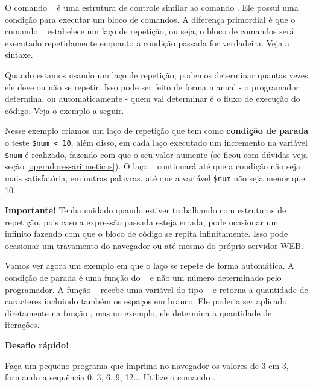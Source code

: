 O comando \comandowhile~ é uma estrutura de controle similar ao comando \comandoif. Ele possui 
uma condição para executar um bloco de comandos. A diferença primordial é que o comando 
\comandowhile~ estabelece um laço de repetição, ou seja, o bloco de comandos será executado 
repetidamente enquanto a condição passada for verdadeira. Veja a sintaxe.



Quando estamos usando um laço de repetição, podemos determinar quantas vezes ele deve 
ou não se repetir. Isso pode ser feito de forma manual - o programador determina, 
ou automaticamente - quem vai determinar é o fluxo de execução do código. Veja o exemplo
a seguir.



Nesse exemplo criamos um laço de repetição que tem como \textbf{condição de parada} o 
teste \texttt{\$num < 10}, além disso, em cada laço executado um incremento 
na variável \texttt{\$num} é realizado, fazendo com que o seu valor aumente 
(se ficou com dúvidas veja seção \ref{operadores-aritmeticos}). O laço 
\comandowhile~ continuará até que a condição não seja mais satisfatória, 
em outras palavras, até que a variável \texttt{\$num} não seja menor que 10.


\begin{framed}
\textbf{{\Large Importante!}}
Tenha cuidado quando estiver trabalhando com estruturas de repetição, pois caso a expressão 
passada esteja errada, pode ocasionar um \lacoloop~ infinito fazendo com que o bloco de 
código se repita infinitamente. Isso pode ocasionar um travamento do navegador ou 
até mesmo do próprio servidor WEB.
\end{framed}

Vamos ver agora um exemplo em que o laço se repete de forma automática. A condição de parada 
é uma função do \php~ e não um número determinado pelo programador. A função \comandostrlen~
recebe uma variável do tipo \tipostring~ e retorna a quantidade de caracteres incluindo 
também os espaços em branco. Ele poderia ser aplicado diretamente na função \funcaoecho, 
mas no exemplo, ele determina a quantidade de iterações. 



\begin{framed}
\textbf{{\Large Desafio rápido!}}

Faça um pequeno programa que imprima no navegador os valores de 3 em 3, formando
a sequência 0, 3, 6, 9, 12... Utilize o comando \comandowhile. 

\end{framed}



